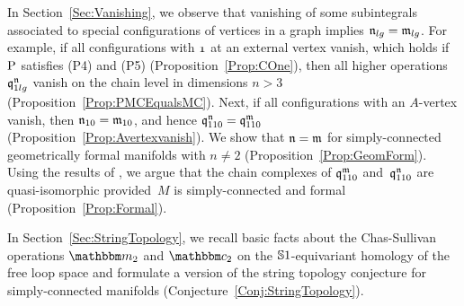 \documentclass[\MainFolder/Text.tex]{subfiles}
\begin{document}
In Section~\ref{Sec:Vanishing}, we observe that vanishing of some subintegrals associated to special configurations of vertices in a graph implies $\mathfrak{n}_{lg} = \mathfrak{m}_{lg}$.
For example, if all configurations with $\NOne$ at an external vertex vanish, which holds if $\mathrm{P}$ satisfies (P4) and (P5) (Proposition~\ref{Prop:COne}), then all higher operations $\mathfrak{q}_{1lg}^{\mathfrak{n}}$ vanish on the chain level in dimensions $n>3$ (Proposition~\ref{Prop:PMCEqualsMC}).
Next, if all configurations with an $A$-vertex vanish, then $\mathfrak{n}_{10}=\mathfrak{m}_{10}$, and hence $\mathfrak{q}_{110}^{\mathfrak{n}} = \mathfrak{q}_{110}^{\mathfrak{m}}$ (Proposition~\ref{Prop:Avertexvanish}).
We show that $\mathfrak{n} = \mathfrak{m}$ for simply-connected geometrically formal manifolds with $n\neq 2$ (Proposition~\ref{Prop:GeomForm}).
Using the results of \cite{Cieliebak2018}, we argue that the chain complexes of $\mathfrak{q}_{110}^{\mathfrak{m}}$ and~$\mathfrak{q}_{110}^{\mathfrak{n}}$ are quasi-isomorphic provided~$M$ is simply-connected and formal (Proposition~\ref{Prop:Formal}).


In Section~\ref{Sec:StringTopology}, we recall basic facts about the Chas-Sullivan operations $\StringOp_2$ and $\StringCoOp_2$ on the $\mathbb{S}{1}$-equivariant homology of the free loop space and formulate a version of the string topology conjecture for simply-connected manifolds (Conjecture~\ref{Conj:StringTopology}).
 
\end{document}
